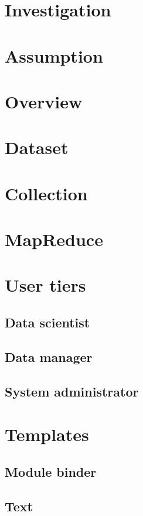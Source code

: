 \section{Investigation}

\section{Assumption}

\section{Overview}

\section{Dataset}

\section{Collection}

\section{MapReduce}

\section{User tiers}
\subsection{Data scientist}
\subsection{Data manager}
\subsection{System administrator}

\section{Templates}
\subsection{Module binder}
\subsection{Text}
